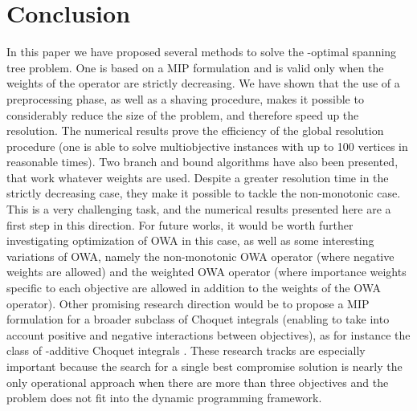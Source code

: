 \documentclass[final,3p,times]{elsarticle}
\begin{document}
\section{Conclusion}

In this paper we have proposed several methods to solve the
-optimal spanning tree problem. One is based on a MIP
formulation and is valid only when the weights of the  operator
are strictly decreasing. We have shown that the use of a preprocessing
phase, as well as a shaving procedure, makes it possible to
considerably reduce the size of the problem, and therefore speed up
the resolution. The numerical results prove the efficiency of the global resolution procedure (one is able to solve multiobjective instances with up to 100 vertices in reasonable times). Two branch and bound algorithms have also been
presented, that work whatever weights are used. Despite a greater resolution time in the strictly decreasing case, they make it possible to tackle the non-monotonic case. This is a very challenging task, and the numerical results presented here are a first step in this direction. For future works, it would be worth further investigating optimization of OWA in this case, as well as some interesting variations of OWA, namely the non-monotonic OWA operator \cite{Yager99} (where negative
weights are allowed) and the weighted OWA operator \cite{Torra97}
(where importance weights specific to each objective are allowed in
addition to the weights of the OWA operator). Other promising research
direction would be to propose a MIP formulation for a broader subclass
of Choquet integrals (enabling to take into account positive and
negative interactions between objectives), as for instance the class of
-additive Choquet integrals \cite{Grabi97}. These research tracks
are especially important because the search for a single best
compromise solution is nearly the only operational approach when there
are more than three objectives and the problem does not fit into
the dynamic programming framework. 








         
\end{document}
